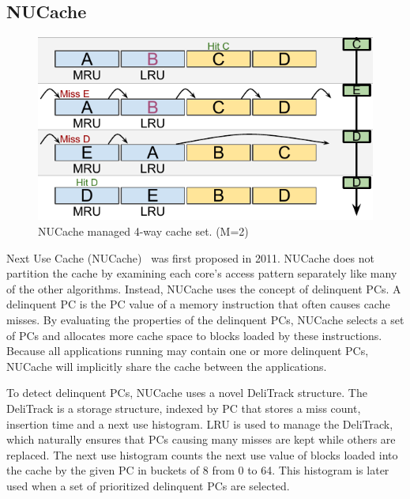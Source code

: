 
\subsection{NUCache}
\label{sec:algorithms:nucache}

\begin{figure}[ht]
    \centering
    \includegraphics[width=.65\textwidth]{figures/algorithms/NUCache}
    \caption[NUCache managed 4-way cache set.]{NUCache managed 4-way cache set. (M=2)}
    \label{fig:algorithms:drrip_example}
\end{figure}

Next Use Cache (NUCache)~\cite{Manikantan2011} was first proposed in 2011.
NUCache does not partition the cache by examining each core's access pattern separately like many of the other algorithms. 
Instead, NUCache uses the concept of delinquent PCs.
A delinquent PC is the PC value of a memory instruction that often causes cache misses.
By evaluating the properties of the delinquent PCs, NUCache selects a set of PCs and allocates more cache space to blocks loaded by these instructions.
Because all applications running may contain one or more delinquent PCs, NUCache will implicitly share the cache between the applications.

To detect delinquent PCs, NUCache uses a novel DeliTrack structure.
The DeliTrack is a storage structure, indexed by PC that stores a miss count, insertion time and a next use histogram. 
LRU is used to manage the DeliTrack, which naturally ensures that PCs causing many misses are kept while others are replaced.
The next use histogram counts the next use value of blocks loaded into the cache by the given PC in buckets of 8 from 0 to 64.
This histogram is later used when a set of prioritized delinquent PCs are selected.

